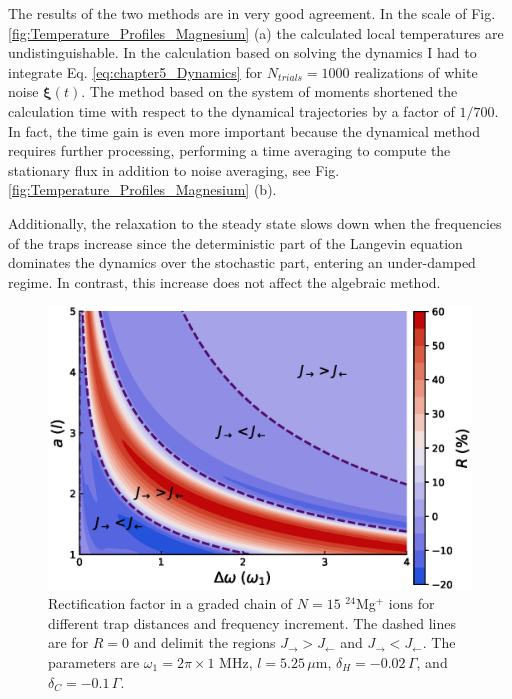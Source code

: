The results of the two methods are in very good agreement. In the scale of Fig. \ref{fig:Temperature_Profiles_Magnesium} (a)
the calculated local temperatures are undistinguishable. In the calculation based on solving the dynamics I had to integrate Eq. \eqref{eq:chapter5_Dynamics} for $N_{trials} = 1000$ realizations of white noise $\bm{\xi}(t)$. The method based on the system of moments
shortened the calculation time with respect to the dynamical trajectories   by a factor of $1/700$. In fact, the time gain is even more important because
the dynamical method requires further processing, performing a time averaging to compute the stationary flux in addition to noise averaging, see Fig.  \ref{fig:Temperature_Profiles_Magnesium} (b).


Additionally, the relaxation to the steady state slows down when the frequencies of the traps increase since the deterministic part of the Langevin equation dominates the dynamics over the stochastic part, entering an under-damped regime. In contrast, this increase does not affect the
algebraic method.
\begin{figure}
  \center
  \includegraphics[width=0.75\linewidth]{Figures/Graded_24Mg_Rectification_VS_Gradient_and_lattConstant.eps}
  \caption{ Rectification factor in a graded chain of $N=15$ $^{24}$Mg$^+$ ions for different trap distances and frequency increment. The dashed lines are for $R = 0$ and delimit the regions $J_\rightarrow > J_\leftarrow$ and $J_\rightarrow < J_\leftarrow$. The parameters  are $\omega_1 = 2 \pi \times 1$ MHz, $l = 5.25\,\mu$m, $\delta_H = -0.02 \,\Gamma$, and $\delta_C = -0.1 \, \Gamma$.}
  \label{fig:Graded_24Mg_Rectification_VS_Gradient_and_lattConstant}
\end{figure}
%
%
%
%

